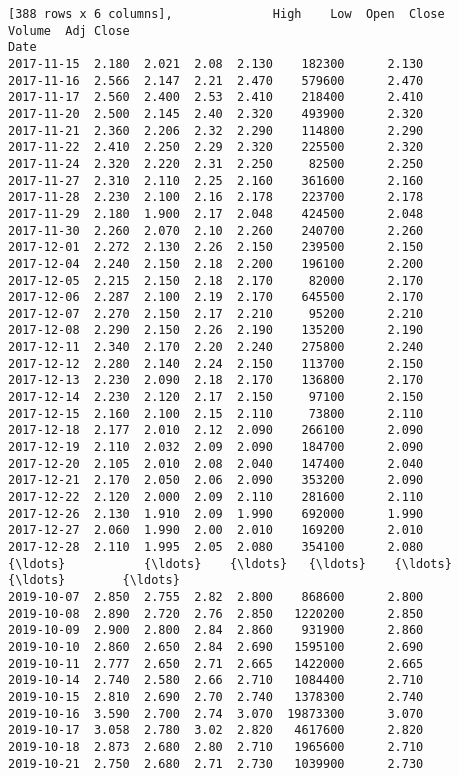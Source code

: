 \documentclass[11pt]{article}
\begin{document}
\begin{Verbatim}[commandchars=\\\{\}]
[388 rows x 6 columns],              High    Low  Open  Close    Volume  Adj Close
Date                                                      
2017-11-15  2.180  2.021  2.08  2.130    182300      2.130
2017-11-16  2.566  2.147  2.21  2.470    579600      2.470
2017-11-17  2.560  2.400  2.53  2.410    218400      2.410
2017-11-20  2.500  2.145  2.40  2.320    493900      2.320
2017-11-21  2.360  2.206  2.32  2.290    114800      2.290
2017-11-22  2.410  2.250  2.29  2.320    225500      2.320
2017-11-24  2.320  2.220  2.31  2.250     82500      2.250
2017-11-27  2.310  2.110  2.25  2.160    361600      2.160
2017-11-28  2.230  2.100  2.16  2.178    223700      2.178
2017-11-29  2.180  1.900  2.17  2.048    424500      2.048
2017-11-30  2.260  2.070  2.10  2.260    240700      2.260
2017-12-01  2.272  2.130  2.26  2.150    239500      2.150
2017-12-04  2.240  2.150  2.18  2.200    196100      2.200
2017-12-05  2.215  2.150  2.18  2.170     82000      2.170
2017-12-06  2.287  2.100  2.19  2.170    645500      2.170
2017-12-07  2.270  2.150  2.17  2.210     95200      2.210
2017-12-08  2.290  2.150  2.26  2.190    135200      2.190
2017-12-11  2.340  2.170  2.20  2.240    275800      2.240
2017-12-12  2.280  2.140  2.24  2.150    113700      2.150
2017-12-13  2.230  2.090  2.18  2.170    136800      2.170
2017-12-14  2.230  2.120  2.17  2.150     97100      2.150
2017-12-15  2.160  2.100  2.15  2.110     73800      2.110
2017-12-18  2.177  2.010  2.12  2.090    266100      2.090
2017-12-19  2.110  2.032  2.09  2.090    184700      2.090
2017-12-20  2.105  2.010  2.08  2.040    147400      2.040
2017-12-21  2.170  2.050  2.06  2.090    353200      2.090
2017-12-22  2.120  2.000  2.09  2.110    281600      2.110
2017-12-26  2.130  1.910  2.09  1.990    692000      1.990
2017-12-27  2.060  1.990  2.00  2.010    169200      2.010
2017-12-28  2.110  1.995  2.05  2.080    354100      2.080
{\ldots}           {\ldots}    {\ldots}   {\ldots}    {\ldots}       {\ldots}        {\ldots}
2019-10-07  2.850  2.755  2.82  2.800    868600      2.800
2019-10-08  2.890  2.720  2.76  2.850   1220200      2.850
2019-10-09  2.900  2.800  2.84  2.860    931900      2.860
2019-10-10  2.860  2.650  2.84  2.690   1595100      2.690
2019-10-11  2.777  2.650  2.71  2.665   1422000      2.665
2019-10-14  2.740  2.580  2.66  2.710   1084400      2.710
2019-10-15  2.810  2.690  2.70  2.740   1378300      2.740
2019-10-16  3.590  2.700  2.74  3.070  19873300      3.070
2019-10-17  3.058  2.780  3.02  2.820   4617600      2.820
2019-10-18  2.873  2.680  2.80  2.710   1965600      2.710
2019-10-21  2.750  2.680  2.71  2.730   1039900      2.730

\end{Verbatim}
\end{document}

